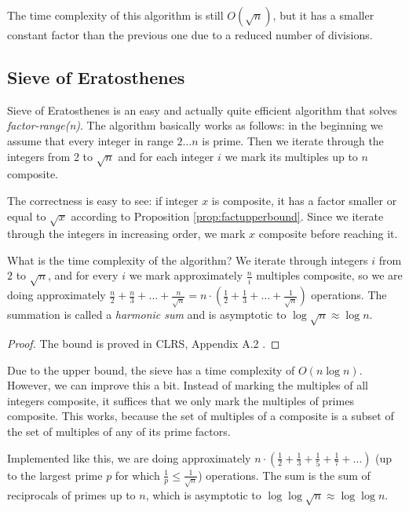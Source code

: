 \documentclass[12pt] {article}
\theoremstyle{plain}
\theoremstyle{definition}
\begin{document}
The time complexity of this algorithm is still $O(\sqrt{n})$, but it has a smaller constant factor than the previous one due to a reduced number of divisions.

\subsection {Sieve of Eratosthenes}

Sieve of Eratosthenes is an easy and actually quite efficient algorithm that solves \textit{factor-range(n)}. The algorithm basically works as follows: in the beginning we assume that every integer in range $2 \dots n$ is prime. Then we iterate through the integers from 2 to $\sqrt{n}$ and for each integer $i$ we mark its multiples up to $n$ composite.

The correctness is easy to see: if integer $x$ is composite, it has a factor smaller or equal to $\sqrt{x}$ according to Proposition \ref{prop:factupperbound}. Since we iterate through the integers in increasing order, we mark $x$ composite before reaching it.

What is the time complexity of the algorithm? We iterate through integers $i$ from $2$ to $\sqrt{n}$, and for every $i$ we mark approximately $\frac{n}{i}$ multiples composite, so we are doing approximately $\frac{n}{2} + \frac{n}{3} + \dots + \frac{n}{\sqrt{n}} = n \cdot (\frac{1}{2} + \frac{1}{3} + \dots + \frac{1}{\sqrt{n}})$ operations. The summation is called a \textit{harmonic sum} and is asymptotic to $\log{\sqrt{n}} \approx \log{n}$.

\begin{proof}
The bound is proved in CLRS, Appendix A.2 \cite{clrs}.
\end{proof}

Due to the upper bound, the sieve has a time complexity of $O(n \log n)$. However, we can improve this a bit. Instead of marking the multiples of all integers composite, it suffices that we only mark the multiples of primes composite. This works, because the set of multiples of a composite is a subset of the set of multiples of any of its prime factors. 

Implemented like this, we are doing approximately $n \cdot (\frac{1}{2} + \frac{1}{3} + \frac{1}{5} + \frac{1}{7} + \dots)$ (up to the largest prime $p$ for which  $\frac{1}{p} \leq \frac{1}{\sqrt{n}}$) operations. The sum is the sum of reciprocals of primes up to $n$, which is asymptotic to $\log{\log{\sqrt{n}}} \approx \log{\log{n}}$.
\end{document}
